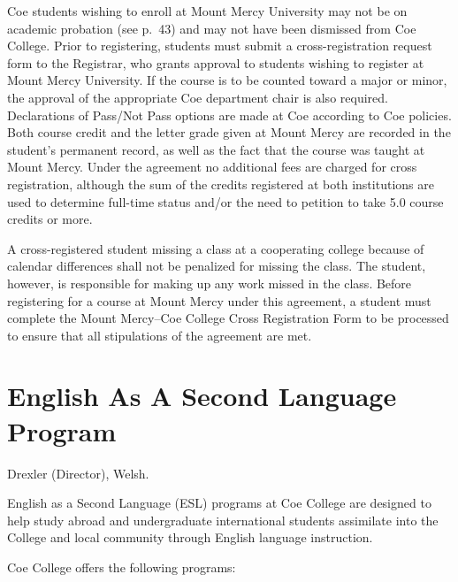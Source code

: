 \documentclass[
  letterpaper,
]{scrbook}
\begin{document}
Coe students wishing to enroll at Mount Mercy University may not be on
academic probation (see p.~43) and may not have been dismissed from Coe
College. Prior to registering, students must submit a cross-registration
request form to the Registrar, who grants approval to students wishing
to register at Mount Mercy University. If the course is to be counted
toward a major or minor, the approval of the appropriate Coe department
chair is also required. Declarations of Pass/Not Pass options are made
at Coe according to Coe policies. Both course credit and the letter
grade given at Mount Mercy are recorded in the student's permanent
record, as well as the fact that the course was taught at Mount Mercy.
Under the agreement no additional fees are charged for cross
registration, although the sum of the credits registered at both
institutions are used to determine full-time status and/or the need to
petition to take 5.0 course credits or more.

A cross-registered student missing a class at a cooperating college
because of calendar differences shall not be penalized for missing the
class. The student, however, is responsible for making up any work
missed in the class. Before registering for a course at Mount Mercy
under this agreement, a student must complete the Mount Mercy--Coe
College Cross Registration Form to be processed to ensure that all
stipulations of the agreement are met.

\section{English As A Second Language
Program}\label{english-as-a-second-language-program}

Drexler (Director), Welsh.

English as a Second Language (ESL) programs at Coe College are designed
to help study abroad and undergraduate international students assimilate
into the College and local community through English language
instruction.

Coe College offers the following programs:
\end{document}
